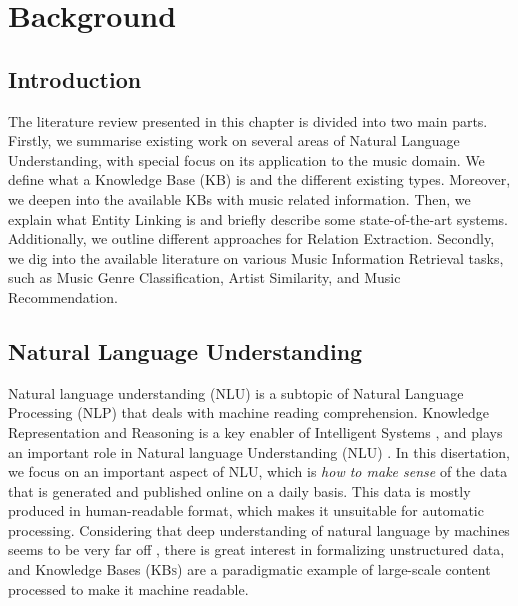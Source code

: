 
\chapter{Background}
\label{sec:SOA}

\section{Introduction}
\label{sec:SOA:Introduction}

The literature review presented in this chapter is divided into two main parts.
Firstly, we summarise existing work on several areas of Natural Language Understanding, with special focus on its application to the music domain. 
We define what a Knowledge Base (KB) is and the different existing types. Moreover, we deepen into the available KBs with music related information.
Then, we explain what Entity Linking is and briefly describe some state-of-the-art systems. Additionally, we outline different approaches for Relation Extraction. 
Secondly, we dig into the available literature on various Music Information Retrieval tasks, such as Music Genre Classification, Artist Similarity, and Music Recommendation.


\section{Natural Language Understanding}
\label{sec:SOA:nlu}

Natural language understanding (NLU) is a subtopic of Natural Language Processing (NLP) that deals with machine reading comprehension.
Knowledge Representation and Reasoning is a key enabler of Intelligent Systems \cite{Suchaneketal2007}, and plays an important role in Natural language Understanding (NLU) \cite{BaralandDeGiacomo2015}.
In this disertation, we focus on an important aspect of NLU, which is \textit{how to make sense} of the data that is generated and published online on a daily basis. This data is mostly produced in human-readable format, which makes it unsuitable for automatic processing. Considering that deep understanding of natural language by machines seems to be very far off \cite{CambriaandWhite2014}, there is great interest in formalizing unstructured data, and Knowledge Bases (\textsc{KBs}) are a paradigmatic example of large-scale content processed to make it machine readable.

